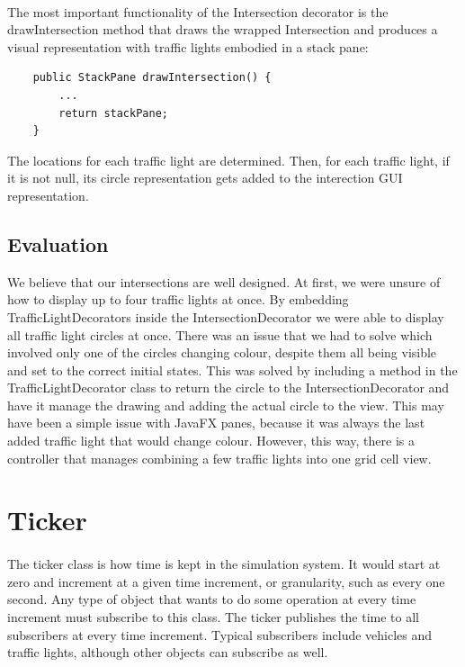 \documentclass[a4paper,11pt,titlepage]{article}
\begin{document}
\paragraph{}
The most important functionality of the Intersection decorator is the drawIntersection method that draws the wrapped Intersection and produces a visual representation with traffic lights embodied in a stack pane:
\begin{lstlisting}
	public StackPane drawIntersection() {
		...
		return stackPane;	
	}
\end{lstlisting}
The locations for each traffic light are determined. Then, for each traffic light, if it is not null, its circle representation gets added to the interection GUI representation.
\subsection{Evaluation}
We believe that our intersections are well designed. At first, we were unsure of how to display up to four traffic lights at once. By embedding TrafficLightDecorators inside the IntersectionDecorator we were able to display all traffic light circles at once. There was an issue that we had to solve which involved only one of the circles changing colour, despite them all being visible and set to the correct initial states. This was solved by including a method in the TrafficLightDecorator class to return the circle to the IntersectionDecorator and have it manage the drawing and adding the actual circle to the view. This may have been a simple issue with JavaFX panes, because it was always the last added traffic light that would change colour. However, this way, there is a controller that manages combining a few traffic lights into one grid cell view. 

\section{Ticker}
\paragraph{}
The ticker class is how time is kept in the simulation system. It would start at zero and increment at a given time increment, or granularity, such as every one second. Any type of object that wants to do some operation at every time increment must subscribe to this class. The ticker publishes the time to all subscribers at every time increment. Typical subscribers include vehicles and traffic lights, although other objects can subscribe as well.
\end{document}
